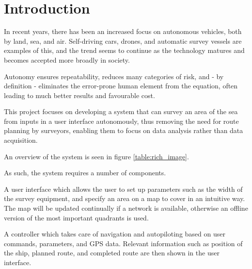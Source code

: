 \chapter{Introduction}
In recent years, there has been an increased focus on autonomous vehicles, both by land, sea, and air. Self-driving cars, drones, and automatic survey vessels are examples of this, and the trend seems to continue as the technology matures and becomes accepted more broadly in society.

Autonomy ensures repeatability, reduces many categories of risk, and - by definition - eliminates the error-prone human element from the equation, often leading to much better results and favourable cost. 

This project focuses on developing a system that can survey an area of the sea from inputs in a user interface autonomously, thus removing the need for route planning by surveyors, enabling them to focus on data analysis rather than data acquisition. 

An overview of the system is seen in figure \ref{table:rich_image}.

As such, the system requires a number of components. 

A user interface which allows the user to set up parameters such as the width of the survey equipment, and specify an area on a map to cover in an intuitive way. The map will be updated continually if a network is available, otherwise an offline version of the most important quadrants is used.

A controller which takes care of navigation and autopiloting based on user commands, parameters, and GPS data. Relevant information such as position of the ship, planned route, and completed route are then shown in the user interface.

